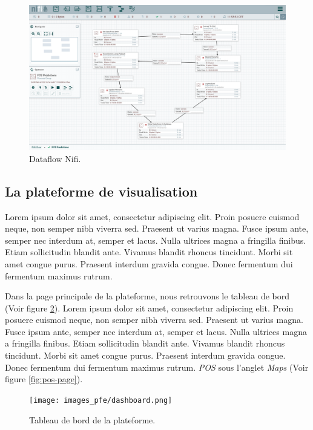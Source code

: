 \begin{figure}[hbt!]
  \centering
  \includegraphics[width=15cm]{images_pfe/NIFI_DATAFLOW.png}
  \caption{Dataflow Nifi.}
  \label{fig:nifi-dataflow}
\end{figure}
\FloatBarrier

\subsection{La plateforme de visualisation}
Lorem ipsum dolor sit amet, consectetur adipiscing elit. Proin posuere euismod neque, non semper nibh viverra sed. Praesent ut varius magna. Fusce ipsum ante, semper nec interdum at, semper et lacus. Nulla ultrices magna a fringilla finibus. Etiam sollicitudin blandit ante. Vivamus blandit rhoncus tincidunt. Morbi sit amet congue purus. Praesent interdum gravida congue. Donec fermentum dui fermentum maximus rutrum.

\medskip

Dans la page principale de la plateforme, nous retrouvons le tableau de bord (Voir figure \ref{fig:dashboard-page}). Lorem ipsum dolor sit amet, consectetur adipiscing elit. Proin posuere euismod neque, non semper nibh viverra sed. Praesent ut varius magna. Fusce ipsum ante, semper nec interdum at, semper et lacus. Nulla ultrices magna a fringilla finibus. Etiam sollicitudin blandit ante. Vivamus blandit rhoncus tincidunt. Morbi sit amet congue purus. Praesent interdum gravida congue. Donec fermentum dui fermentum maximus rutrum. \textit{POS} sous l'anglet \textit{Maps} (Voir figure \ref{fig:pos-page}). 

\medskip



\begin{figure}[hbt!]
  \centering
  \texttt{[image: images\_pfe/dashboard.png]}
  \caption{Tableau de bord de la plateforme.}
  \label{fig:dashboard-page}
\end{figure}
\FloatBarrier

